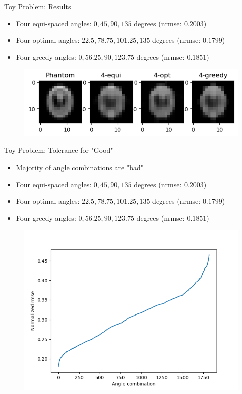 \documentclass[english,aspectratio=43]{beamer}
\begin{document}
\begin{frame}{Toy Problem: Results}
	\begin{itemize}
	    \item Four equi-spaced angles: $0, 45, 90, 135$ degrees (nrmse: $0.2003$)
	    \item Four optimal angles: $22.5, 78.75, 101.25, 135$ degrees (nrmse: $0.1799$)
	    \item Four greedy angles: $0, 56.25, 90, 123.75$ degrees (nrmse: $0.1851$)
        
	\end{itemize}
	
	\begin{figure}
    \includegraphics[scale=0.9]{Figs/plot_recon_compare2.png}
    \end{figure}
	
\end{frame}

\begin{frame}{Toy Problem: Tolerance for "Good"}
	\begin{itemize}
	    \item Majority of angle combinations are "bad"
	    \item Four equi-spaced angles: $0, 45, 90, 135$ degrees (nrmse: $0.2003$)
	    \item Four optimal angles: $22.5, 78.75, 101.25, 135$ degrees (nrmse: $0.1799$)
	    \item Four greedy angles: $0, 56.25, 90, 123.75$ degrees (nrmse: $0.1851$)
	\end{itemize}
	
	\begin{figure}
    \includegraphics[scale=0.45]{Figs/cost_angles_plot.png}
    \end{figure}
	
\end{frame}
\end{document}

